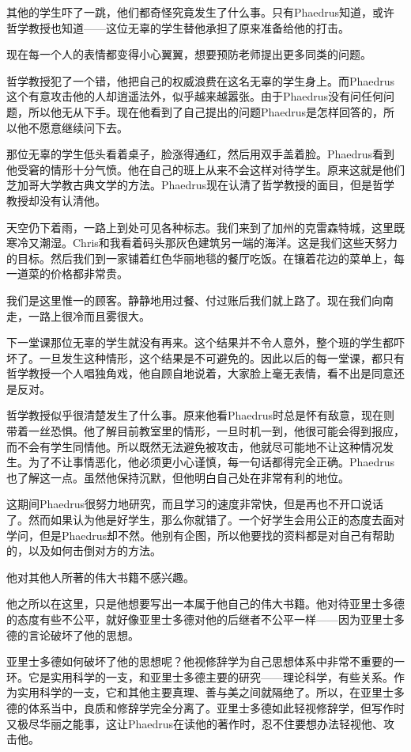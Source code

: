 \documentclass[UTF8]{article}
\begin{document}
\par 其他的学生吓了一跳，他们都奇怪究竟发生了什么事。只有Phaedrus知道，或许哲学教授也知道——这位无辜的学生替他承担了原来准备给他的打击。
\par 现在每一个人的表情都变得小心翼翼，想要预防老师提出更多同类的问题。
\par 哲学教授犯了一个错，他把自己的权威浪费在这名无辜的学生身上。而Phaedrus这个有意攻击他的人却逍遥法外，似乎越来越嚣张。由于Phaedrus没有问任何问题，所以他无从下手。现在他看到了自己提出的问题Phaedrus是怎样回答的，所以他不愿意继续问下去。
\par 那位无辜的学生低头看着桌子，脸涨得通红，然后用双手盖着脸。Phaedrus看到他受窘的情形十分气愤。他在自己的班上从来不会这样对待学生。原来这就是他们芝加哥大学教古典文学的方法。Phaedrus现在认清了哲学教授的面目，但是哲学教授却没有认清他。
\par 天空仍下着雨，一路上到处可见各种标志。我们来到了加州的克雷森特城，这里既寒冷又潮湿。Chris和我看着码头那灰色建筑另一端的海洋。这是我们这些天努力的目标。然后我们到一家铺着红色华丽地毯的餐厅吃饭。在镶着花边的菜单上，每一道菜的价格都非常贵。
\par 我们是这里惟一的顾客。静静地用过餐、付过账后我们就上路了。现在我们向南走，一路上很冷而且雾很大。
\par 下一堂课那位无辜的学生就没有再来。这个结果并不令人意外，整个班的学生都吓坏了。一旦发生这种情形，这个结果是不可避免的。因此以后的每一堂课，都只有哲学教授一个人唱独角戏，他自顾自地说着，大家脸上毫无表情，看不出是同意还是反对。
\par 哲学教授似乎很清楚发生了什么事。原来他看Phaedrus时总是怀有敌意，现在则带着一丝恐惧。他了解目前教室里的情形，一旦时机一到，他很可能会得到报应，而不会有学生同情他。所以既然无法避免被攻击，他就尽可能地不让这种情况发生。为了不让事情恶化，他必须更小心谨慎，每一句话都得完全正确。Phaedrus也了解这一点。虽然他保持沉默，但他明白自己处在非常有利的地位。
\par 这期间Phaedrus很努力地研究，而且学习的速度非常快，但是再也不开口说话了。然而如果认为他是好学生，那么你就错了。一个好学生会用公正的态度去面对学问，但是Phaedrus却不然。他别有企图，所以他要找的资料都是对自己有帮助的，以及如何击倒对方的方法。
\par 他对其他人所著的伟大书籍不感兴趣。
\par 他之所以在这里，只是他想要写出一本属于他自己的伟大书籍。他对待亚里士多德的态度有些不公平，就好像亚里士多德对他的后继者不公平一样——因为亚里士多德的言论破坏了他的思想。
\par 亚里士多德如何破坏了他的思想呢？他视修辞学为自己思想体系中非常不重要的一环。它是实用科学的一支，和亚里士多德主要的研究——理论科学，有些关系。作为实用科学的一支，它和其他主要真理、善与美之间就隔绝了。所以，在亚里士多德的体系当中，良质和修辞学完全分离了。亚里士多德如此轻视修辞学，但写作时又极尽华丽之能事，这让Phaedrus在读他的著作时，忍不住要想办法轻视他、攻击他。
\end{document}

